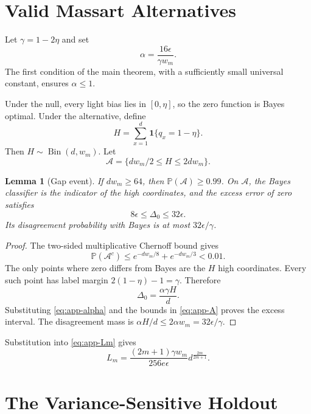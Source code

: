 \documentclass[twoside]{article}
\newtheorem{lemma}[theorem]{Lemma}
\newcommand{\PP}{\mathbb P}
\newcommand{\1}{\mathbf 1}
\begin{document}
\section{Valid Massart Alternatives}
\label{app:gap}

Let $\gamma=1-2\eta$ and set
\begin{equation}
 \alpha=\frac{16\epsilon}{\gamma w_m}.
 \label{eq:app-alpha}
\end{equation}
The first condition of the main theorem, with a sufficiently small universal
constant, ensures $\alpha\le1$.

Under the null, every light bias lies in $[0,\eta]$, so the zero function is
Bayes optimal. Under the alternative, define
\[
 H=\sum_{x=1}^d\1\{q_x=1-\eta\}.
\]
Then $H\sim\operatorname{Bin}(d,w_m)$. Let
\begin{equation}
 \mathcal A=\{dw_m/2\le H\le2dw_m\}.
 \label{eq:app-A}
\end{equation}

\begin{lemma}[Gap event]
\label{lem:gap-event}
If $dw_m\ge64$, then $\PP(\mathcal A)\ge0.99$. On $\mathcal A$, the Bayes
classifier is the indicator of the high coordinates, and the excess error of
zero satisfies
\[
 8\epsilon\le\Delta_0\le32\epsilon.
\]
Its disagreement probability with Bayes is at most $32\epsilon/\gamma$.
\end{lemma}

\begin{proof}
The two-sided multiplicative Chernoff bound gives
\[
 \PP(\mathcal A^c)
 \le e^{-dw_m/8}+e^{-dw_m/3}<0.01.
\]
The only points where zero differs from Bayes are the $H$ high coordinates.
Every such point has label margin $2(1-\eta)-1=\gamma$. Therefore
\[
 \Delta_0=\frac{\alpha\gamma H}{d}.
\]
Substituting \eqref{eq:app-alpha} and the bounds in
\eqref{eq:app-A} proves the excess interval. The disagreement mass is
$\alpha H/d\le2\alpha w_m=32\epsilon/\gamma$.
\end{proof}

Substitution into \eqref{eq:app-Lm} gives
\begin{equation}
 L_m=\frac{(2m+1)\gamma w_m}{256e\epsilon}
 d^{\frac{2m}{2m+1}}.
 \label{eq:app-Lm-final}
\end{equation}

\section{The Variance-Sensitive Holdout}
\label{app:holdout}
\end{document}
